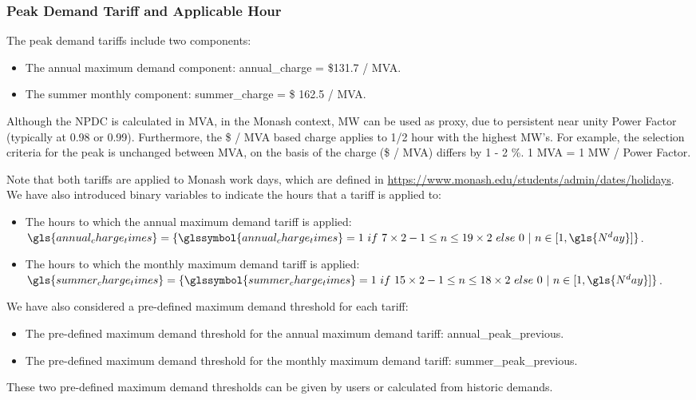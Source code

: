 \subsubsection{Peak Demand Tariff and Applicable Hour}
\label{prob:input:tariff}

The peak demand tariffs include two components:

\begin{itemize}
	\item The annual maximum demand component: \gls{annual_charge} = \$131.7 / MVA.
	
	\item The summer monthly component: \gls{summer_charge} = \$ 162.5 / MVA. 
	
\end{itemize}
Although the \gls{NPDC} is calculated in MVA, in the Monash context, MW can be used as proxy, due to persistent near unity Power Factor (typically at 0.98 or 0.99). Furthermore, the \$ / MVA based charge applies to 1/2 hour with the highest MW's. For example, the selection criteria for the peak is unchanged between MVA, on the basis of the charge (\$ / MVA) differs by 1 - 2 \%. 1 MVA = 1 MW / Power Factor. 

Note that both tariffs are applied to Monash work days, which are defined in \url{https://www.monash.edu/students/admin/dates/holidays}.
We have also introduced binary variables to indicate the hours that a tariff is applied to:
\begin{itemize}
	\item The hours to which the annual maximum demand tariff is applied: \\
	$\gls{annual_charge_times} = \{ \glssymbol{annual_charge_times} = 1~ if ~ 7 \times 2 - 1 \leq n \leq 19 \times 2 ~ else~ 0~ \vert ~ n \in [1,\gls{N^day}] \}$.
	
	\item The hours to which the monthly maximum demand tariff is applied: \\
	$\gls{summer_charge_times} = \{ \glssymbol{summer_charge_times} = 1 ~ if ~ 15 \times 2 - 1 \leq n \leq 18 \times 2~  else~  0 ~ \vert ~ n \in [1,\gls{N^day}]\} $.
	
\end{itemize}

We have also considered a pre-defined maximum demand threshold for each tariff:
\begin{itemize}
	\item The pre-defined maximum demand threshold for the annual maximum demand tariff: \gls{annual_peak_previous}.
	
	\item The pre-defined maximum demand threshold for the monthly maximum demand tariff:
	\gls{summer_peak_previous}. 
\end{itemize}
These two pre-defined maximum demand thresholds can be given by users or calculated from historic demands. 

